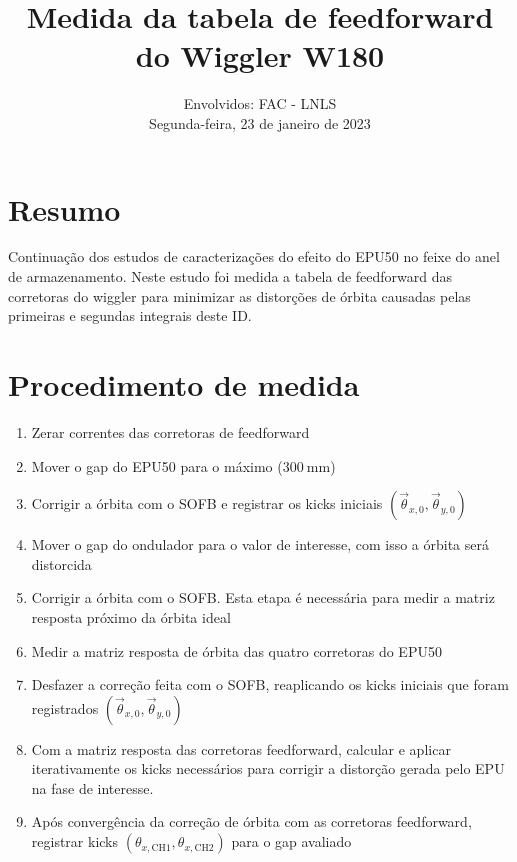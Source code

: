 \documentclass[a4paper,
               keeplastbox,   %
               ]{jacow}
\begin{document}
\title{Medida da tabela de feedforward do Wiggler W180}

\author{Envolvidos: FAC - LNLS \\ Segunda-feira, 23 de janeiro de 2023}
\maketitle
%
\section{Resumo}
Continuação dos estudos de caracterizações do efeito do EPU50 no feixe do anel de armazenamento. Neste estudo foi medida a tabela de feedforward das corretoras do wiggler para minimizar as distorções de órbita causadas pelas primeiras e segundas integrais deste ID. 

\section{Procedimento de medida}

\begin{enumerate}
    \item Zerar correntes das corretoras de feedforward
    \item Mover o gap do EPU50 para o máximo ($\SI{300}{\milli\meter}$)
    \item Corrigir a órbita com o SOFB e registrar os kicks iniciais $\left(\vec{\theta}_{x, 0}, \vec{\theta}_{y, 0}\right)$
    \item Mover o gap do ondulador para o valor de interesse, com isso a órbita será distorcida
    \item Corrigir a órbita com o SOFB. Esta etapa é necessária para medir a matriz resposta próximo da órbita ideal
    \item Medir a matriz resposta de órbita das quatro corretoras do EPU50
    \item Desfazer a correção feita com o SOFB, reaplicando os kicks iniciais que foram registrados $\left(\vec{\theta}_{x, 0}, \vec{\theta}_{y, 0}\right)$
    \item Com a matriz resposta das corretoras feedforward, calcular e aplicar iterativamente os kicks necessários para corrigir a distorção gerada pelo EPU na fase de interesse. 
    \item Após convergência da correção de órbita com as corretoras feedforward, registrar kicks $\left(\theta_{x, \mathrm{CH1}},\theta_{x, \mathrm{CH2}}\right)$ para o gap avaliado
\end{enumerate}
\end{document}
